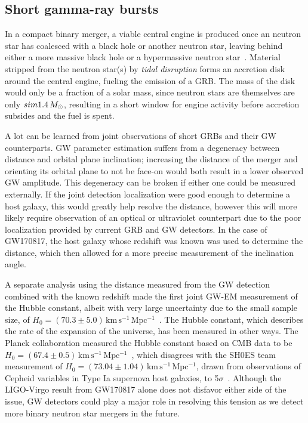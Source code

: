 \subsection{Short gamma-ray bursts}

In a compact binary merger, a viable central engine is produced once an neutron star has coalesced with a black hole or another neutron star, leaving behind either a more massive black hole or a hypermassive neutron star~\citep{Eichler_1989,Nakar_2007}.
Material stripped from the neutron star(s) by \textit{tidal disruption} forms an accretion disk around the central engine, fueling the emission of a GRB.
The mass of the disk would only be a fraction of a solar mass, since neutron stars are themselves are only $sim 1.4\,M_{\odot}$, resulting in a short window for engine activity before accretion subsides and the fuel is spent.

A lot can be learned from joint observations of short GRBs and their GW counterparts.
\ac{GW} parameter estimation suffers from a degeneracy between distance and orbital plane inclination; increasing the distance of the merger and orienting its orbital plane to not be face-on would both result in a lower observed \ac{GW} amplitude.
This degeneracy can be broken if either one could be measured externally.
If the joint detection localization were good enough to determine a host galaxy, this would greatly help resolve the distance, however this will more likely require observation of an optical or ultraviolet counterpart due to the poor localization provided by current \ac{GRB} and \ac{GW} detectors.
In the case of GW170817, the host galaxy whose redshift was known was used to determine the distance, which then allowed for a more precise measurement of the inclination angle.

A separate analysis using the distance measured from the \ac{GW} detection combined with the known redshift made the first joint \ac{GW}-EM measurement of the Hubble constant, albeit with very large uncertainty due to the small sample size, of $H_0 = (70.3 \pm 5.0)\,\mathrm{km\,s^{-1}\,Mpc^{-1}}$~\citep{gw170817_hubble}.
The Hubble constant, which describes the rate of the expansion of the universe, has been measured in other ways.
The Planck collaboration measured the Hubble constant based on \ac{CMB} data to be $H_0 = (67.4 \pm 0.5)\,\mathrm{km\,s^{-1}\,Mpc^{-1}}$~\citep{Planck_2020},
which disagrees with the SH0ES team measurement of $H_0 = (73.04 \pm 1.04)\,\mathrm{km\,s^{-1}\,Mpc^{-1}}$, drawn from observations of Cepheid variables in Type Ia supernova host galaxies, to 5$\sigma$~\citep{Shoes_2018}.
Although the LIGO-Virgo result from GW170817 alone does not disfavor either side of the issue, GW detectors could play a major role in resolving this tension as we detect more binary neutron star mergers in the future.

